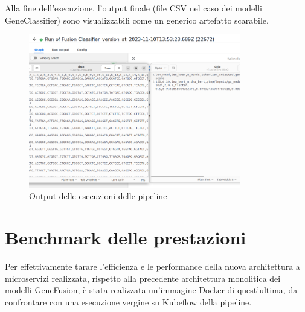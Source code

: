 Alla fine dell'esecuzione, l'output finale (file CSV nel caso dei modelli GeneClassifier) sono visualizzabili come un generico artefatto scarabile.

\begin{figure}[H]
    \centering
    \includegraphics[width=350px]{figures/ch4and5/output.png}
    \caption[Output delle esecuzioni delle pipeline]{Output delle esecuzioni delle pipeline}
    \label{fig:cha6:kf-output}
\end{figure}

\section{Benchmark delle prestazioni}

Per effettivamente tarare l'efficienza e le performance della nuova architettura a microservizi realizzata, rispetto alla precedente architettura monolitica dei modelli GeneFusion, è stata realizzata un'immagine Docker di quest'ultima, da confrontare con una esecuzione vergine su Kubeflow della pipeline.

